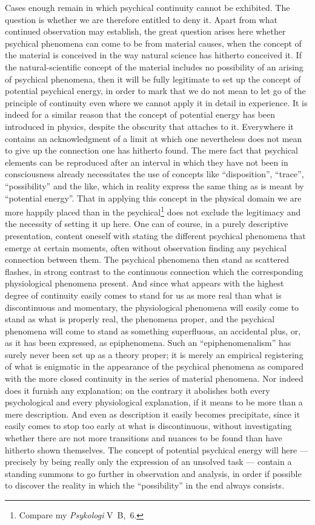 \documentclass[12pt,a4paper]{book}
\newcommand{\opage}[1]{\marginnote{\footnotesize\textit{[#1]}}}
\begin{document}
Cases enough remain in which psychical continuity cannot be exhibited. The
question is whether we are therefore entitled to deny it. Apart from what
continued observation may establish, the great question arises here whether
psychical phenomena can come to be from material causes, when the concept of the
material is conceived in the way natural science has hitherto conceived it. If
the natural-scientific concept of the material includes no possibility of an
arising of psychical phenomena, then it will be fully legitimate to set up the
concept of potential psychical energy, in order to mark that we do not mean to
let go of the principle of continuity even where we cannot apply it in detail in
experience. It is indeed for a similar reason that the concept of potential
energy has been introduced in physics, despite the obscurity that attaches to
it. Everywhere it contains an acknowledgment of a limit at which one \opage{21}nevertheless
does not mean to give up the connection one has hitherto found. The mere fact
that psychical elements can be reproduced after an interval in which they have
not been in consciousness already necessitates the use of concepts like
``disposition'', ``trace'', ``possibility'' and the like, which in reality
express the same thing as is meant by ``potential energy''. That in applying
this concept in the physical domain we are more happily placed than in the
psychical\footnote{Compare my \textit{Psykologi} V~B,~6.} does not exclude the
legitimacy and the necessity of setting it up here. One can of course, in a
purely descriptive presentation, content oneself with stating the different
psychical phenomena that emerge at certain moments, often without observation
finding any psychical connection between them. The psychical phenomena then
stand as scattered flashes, in strong contrast to the continuous connection
which the corresponding physiological phenomena present. And since what appears
with the highest degree of continuity easily comes to stand for us as more real
than what is discontinuous and momentary, the physiological phenomena will
easily come to stand as what is properly real, the phenomena proper, and the
psychical phenomena will come to stand as something superfluous, an accidental
plus, or, as it has been expressed, as epiphenomena. Such an
``epiphenomenalism'' has surely never been set up as a theory proper; it is
merely an empirical registering of what is enigmatic in the appearance of the
psychical phenomena as compared with the more closed continuity in the series of
material phenomena. Nor indeed does it furnish any explanation; on the contrary
it abolishes both every psychological and every physiological explanation, if it
means to be more than a mere description. And even as description it easily
becomes precipitate, since it easily comes to stop too early at what is
discontinuous, without investigating whether there are not more transitions and
nuances to be found than have hitherto shown themselves. The concept of
potential psychical energy will here --- precisely by being really only the
expression of an unsolved task --- contain a standing summons to go further in
observation and analysis, in order if possible to discover the reality in which
the ``possibility'' in the end always consists.
\end{document}
